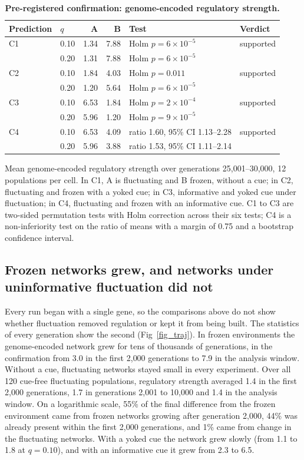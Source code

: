 \documentclass[10pt,letterpaper]{article}
\begin{document}
\begin{table}[!ht]
\centering
\caption{{\bf Pre-registered confirmation: genome-encoded regulatory strength.}}
\small
\begin{tabular}{@{}llrrll@{}}
\toprule
Prediction & $q$ & A & B & Test & Verdict\\
\midrule
C1 & 0.10 & 1.34 & 7.88 & Holm $p=6\times10^{-5}$ & supported\\
   & 0.20 & 1.31 & 7.88 & Holm $p=6\times10^{-5}$ & \\
C2 & 0.10 & 1.84 & 4.03 & Holm $p=0.011$ & supported\\
   & 0.20 & 1.20 & 5.64 & Holm $p=6\times10^{-5}$ & \\
C3 & 0.10 & 6.53 & 1.84 & Holm $p=2\times10^{-4}$ & supported\\
   & 0.20 & 5.96 & 1.20 & Holm $p=9\times10^{-5}$ & \\
C4 & 0.10 & 6.53 & 4.09 & ratio 1.60, 95\% CI 1.13--2.28 & supported\\
   & 0.20 & 5.96 & 3.88 & ratio 1.53, 95\% CI 1.11--2.14 & \\
\bottomrule
\end{tabular}
\begin{flushleft}\footnotesize
Mean genome-encoded regulatory strength over generations 25{,}001--30{,}000, 12
populations per cell. In C1, A is fluctuating and B frozen, without a cue; in C2, fluctuating and
frozen with a yoked cue; in C3, informative and yoked cue under fluctuation; in
C4, fluctuating and frozen with an informative cue. C1 to
C3 are two-sided permutation tests with Holm correction across their six tests;
C4 is a non-inferiority test on the ratio of means with a margin of 0.75 and a
bootstrap confidence interval.
\end{flushleft}
\label{tab_confirm}
\end{table}

\subsection*{Frozen networks grew, and networks under uninformative fluctuation did not}

Every run began with a single gene, so the comparisons above do not show whether
fluctuation removed regulation or kept it from being built. The statistics of
every generation show the second (Fig~\ref{fig_traj}). In frozen environments
the genome-encoded network grew for tens of thousands of generations, in the
confirmation from 3.0 in the first 2{,}000 generations to 7.9 in the analysis
window. Without a cue, fluctuating networks stayed small in every experiment.
Over all 120 cue-free fluctuating populations, regulatory strength averaged 1.4
in the first 2{,}000 generations, 1.7 in generations 2{,}001 to 10{,}000 and 1.4
in the analysis window. On a logarithmic scale, 55\% of the final difference from
the frozen environment came from frozen networks growing after generation
2{,}000, 44\% was already present within the first 2{,}000 generations, and 1\%
came from change in the fluctuating networks. With a yoked cue the network grew
slowly (from 1.1 to 1.8 at $q=0.10$), and with an informative cue it grew from
2.3 to 6.5.
\end{document}
